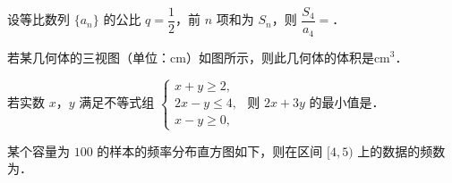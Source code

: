 \begin{question}
设等比数列 $\{a_n\}$ 的公比 $q=\dfrac12$，前 $n$ 项和为 $S_n$，则 $\dfrac{S_4}{a_4}=$\gkblank{}．

\Needspace{0.4\textheight}
\end{question}
\begingroup
\renewenvironment{question}{\Needspace{0.5\textheight}}{}
\begin{question}
若某几何体的三视图（单位：cm）如图所示，则此几何体的体积是\gkblank{}$\mathrm{cm^3}$．
\nopagebreak[4]
\begin{center}\end{center}
\nopagebreak[4]
\end{question}
\endgroup
\begin{question}
若实数 $x$，$y$ 满足不等式组 $\begin{cases}x+y\geqslant2,\\2x-y\leqslant4,\\x-y\geqslant0,\end{cases}$ 则 $2x+3y$ 的最小值是\gkblank{}．

\Needspace{0.4\textheight}
\end{question}
\begingroup
\renewenvironment{question}{\Needspace{0.35\textheight}}{}
\begin{question}
某个容量为 $100$ 的样本的频率分布直方图如下，则在区间 $[4,5)$ 上的数据的频数为\gkblank{}．
\nopagebreak[4]
\begin{center}\end{center}
\nopagebreak[4]
\end{question}
\endgroup
\begingroup
\renewenvironment{question}{\Needspace{0.5\textheight}}{}
